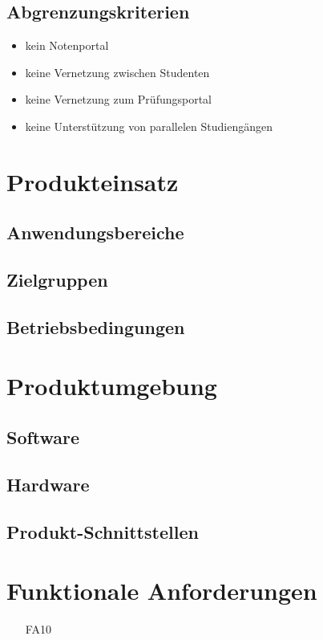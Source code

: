 \documentclass[titlepage=true, parskip=full]{scrartcl}
\begin{document}
\subsection{Abgrenzungskriterien}
\begin{itemize}
	\item kein Notenportal
	\item keine Vernetzung zwischen Studenten
	\item keine Vernetzung zum Prüfungsportal
	\item keine Unterstützung von parallelen Studiengängen
\end{itemize}
\section{Produkteinsatz}

\subsection{Anwendungsbereiche}

\subsection{Zielgruppen}

\subsection{Betriebsbedingungen}

\section{Produktumgebung}

\subsection{Software}

\subsection{Hardware}

\subsection{Produkt-Schnittstellen}

\section{Funktionale Anforderungen}
\begin{itemize}[nosep]
	\item[FA10]
\end{itemize}
\end{document}
